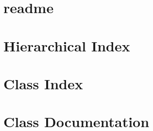 \documentclass[twoside]{book}
\newcommand{\+}{\discretionary{\mbox{\scriptsize$\hookleftarrow$}}{}{}}
\newcommand{\clearemptydoublepage}{%
  \newpage{\pagestyle{empty}\cleardoublepage}%
}
\begin{document}
\chapter{readme}
\label{md__home_deathquasar__projects__m_h_p_c__thesis__code__potts_code_tests_readme}
\hypertarget{md__home_deathquasar__projects__m_h_p_c__thesis__code__potts_code_tests_readme}{}

\chapter{Hierarchical Index}

\chapter{Class Index}

\chapter{Class Documentation}









\backmatter
\newpage
{}
\clearemptydoublepage
{}
\printindex
\end{document}
